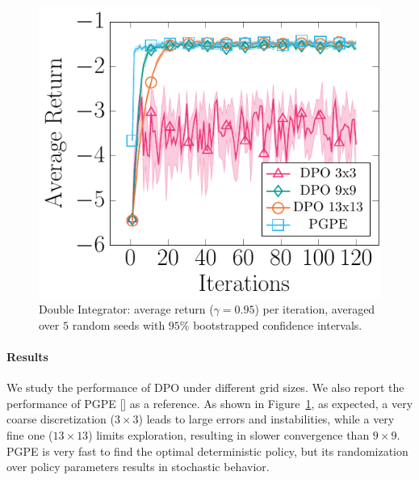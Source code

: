 \begin{figure}[t]
	\centering
	\includegraphics[scale=1]{plots/mass.pdf}
	\caption{Double Integrator: average return ($\gamma=0.95$) per iteration, averaged over $5$ random seeds with $95\%$ bootstrapped confidence intervals.}
	\label{fig:mass}
\end{figure}%

\paragraph{Results}
We study the performance of \ac{DPO} under different grid sizes. We also report the performance of \ac{PGPE} [\cite{sehnke2008policy}] as a reference. As shown in Figure~\ref{fig:mass}, as expected, a very coarse discretization ($3\times3$) leads to large errors and instabilities, while a very fine one ($13\times13$) limits exploration, resulting in slower convergence than $9\times9$. \ac{PGPE} is very fast to find the optimal deterministic policy, but its randomization over policy parameters results in stochastic behavior.
%
